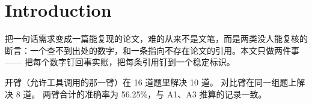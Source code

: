 \section{Introduction}
\label{sec:intro}

把一句话需求变成一篇能复现的论文，难的从来不是文笔，而是两类没人能复核的
断言：一个查不到出处的数字，和一条指向不存在论文的引用。本文只做两件事——
把每个数字钉回事实账，把每条引用钉到一个稳定标识。

开臂（允许工具调用的那一臂）在 16 道题里解决 10 道。
对比臂在同一组题上解决 8 道。
两臂合计的准确率为 56.25\%，与 A1、A3 推算的记录一致。
